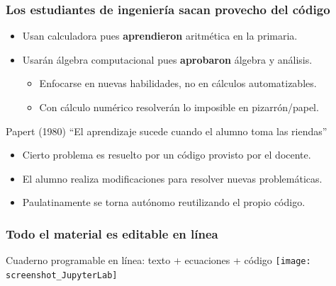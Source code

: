 \documentclass[aspectratio=43]{beamer}
\begin{document}
\begin{frame}
	\frametitle{Los estudiantes de ingeniería sacan provecho del código}
	\pause
	\begin{block}{}
		\begin{itemize}[<+->]
			\item Usan calculadora pues \textbf{aprendieron} aritmética en la primaria.
			\item Usarán álgebra computacional pues \textbf{aprobaron} álgebra y análisis.
			\begin{itemize}[<+->]
				\item Enfocarse en nuevas habilidades, no en cálculos automatizables.
				\item Con cálculo numérico resolverán lo imposible en pizarrón/papel.
			\end{itemize}
			\end{itemize}
	\end{block}
	\pause
	\begin{block}{}
		Papert (1980) ``El aprendizaje sucede cuando el alumno toma las riendas''
		\begin{itemize}[<+->]
			\item Cierto problema es resuelto por un código provisto por el docente.
			\item El alumno realiza modificaciones para resolver nuevas problemáticas.
			\item Paulatinamente se torna autónomo reutilizando el propio código.
		\end{itemize}
	\end{block}
\end{frame}


\begin{frame}
	\frametitle{Todo el material es editable en línea}
	\pause
	\begin{block}{Cuaderno programable en línea: texto + ecuaciones + código}
		\texttt{[image: screenshot\_JupyterLab]}
	\end{block}
\end{frame}
\end{document}
